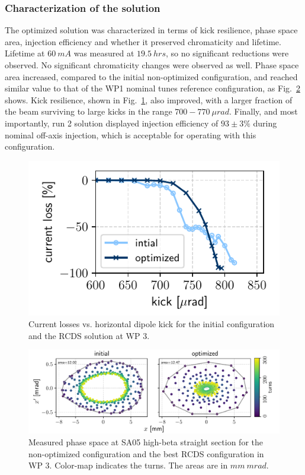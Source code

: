 \subsubsection{Characterization of the solution}
The optimized solution was characterized in terms of kick resilience, phase space area, injection efficiency and whether it preserved chromaticity and lifetime.  Lifetime at $60~\unit{mA}$ was measured at $19.5~\unit{hrs}$, so no significant reductions were observed. No significant chromaticity changes were observed as well. Phase space area increased, compared to the initial non-optimized configuration, and reached similar value to that of the WP1 nominal tunes reference configuration, as Fig.~\ref{fig:wp3_phase_space} shows. Kick resilience, shown in Fig.~\ref{fig:wp3_kick_res}, also improved, with a larger fraction of the beam surviving to large kicks in the range  $700-770~\unit{\mu rad}$. Finally, and most importantly, run 2 solution displayed injection efficiency of $93\pm3\%$ during nominal off-axis injection, which is acceptable for operating with this configuration.
\begin{figure}[tb]
    \centering
    \includegraphics[width=0.6\columnwidth]{Images/wp3_kick_resilience.pdf}
    \caption[Current losses vs. horizontal dipole kick for the initial configuration and the RCDS solution at WP 3.]{Current losses vs. horizontal dipole kick for the initial configuration and the RCDS solution at WP 3.}
    \label{fig:wp3_kick_res}
\end{figure}
\begin{figure}[htb]
    \centering
    \includegraphics[width=\textwidth]{Images/wp3_phase_space.pdf}
    \caption[Measured phase space at SA05 high-beta straight section for the non-optimized configuration and the best RCDS configuration in WP 3.]{Measured phase space at SA05 high-beta straight section for the non-optimized configuration and the best RCDS configuration in WP 3. Color-map indicates the turns. The areas are in $\unit{mm}~\unit{mrad}$.}
    \label{fig:wp3_phase_space}

\end{figure}
